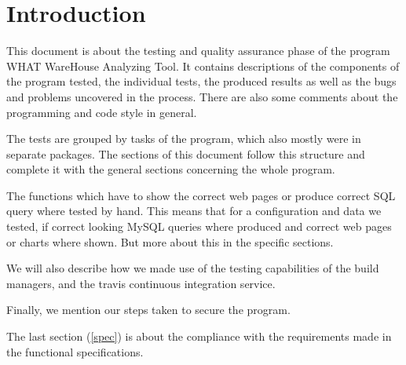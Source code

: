 \section{Introduction}

This document is about the testing and quality assurance phase of the program WHAT WareHouse Analyzing Tool.
It contains descriptions of the components of the program tested, the individual tests,
the produced results as well as the bugs and problems uncovered in the process. 
There are also some comments about the programming and code style in general. 

The tests are grouped by tasks of the program, which also mostly were in separate packages. 
The sections of this document follow this structure and complete it with the 
general sections concerning the whole program. %

The functions which have to show the correct web pages or produce correct SQL query where tested by hand. 
This means that for a configuration and data we tested, 
if correct looking MySQL queries where produced and correct web pages or charts where shown. 
But more about this in the specific sections.

We will also describe how we made use of the testing capabilities of the build managers, 
and the travis continuous integration service.

Finally, we mention our steps taken to secure the program.


The last section (\ref{spec}) is about the compliance with the requirements made in the functional specifications.




 

